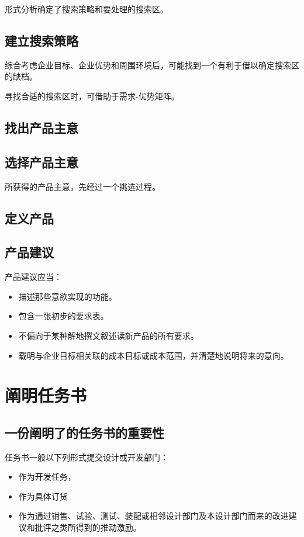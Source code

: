 \documentclass[letterpaper,10pt,english]{sphinxmanual}
\begin{document}
形式分析确定了搜索策略和要处理的搜索区。


\subsection{建立搜索策略}
\label{unit4:id5}
综合考虑企业目标、企业优势和周围环境后，可能找到一个有利于借以确定搜索区的缺档。

寻找合适的搜索区时，可借助于需求-优势矩阵。


\subsection{找出产品主意}
\label{unit4:id6}

\subsection{选择产品主意}
\label{unit4:id7}
所获得的产品主意，先经过一个挑选过程。


\subsection{定义产品}
\label{unit4:id8}

\subsection{产品建议}
\label{unit4:id9}
产品建议应当：
\begin{itemize}
\item {} 
描述那些意欲实现的功能。

\item {} 
包含一张初步的要求表。

\item {} 
不偏向于某种解地撰文叙述读新产品的所有要求。

\item {} 
载明与企业目标相关联的成本目标或成本范围，并清楚地说明将来的意向。

\end{itemize}


\section{阐明任务书}
\label{unit4:id10}

\subsection{一份阐明了的任务书的重要性}
\label{unit4:id11}
任务书一般以下列形式提交设计或开发部门：
\begin{itemize}
\item {} 
作为开发任务，

\item {} 
作为具体订货

\item {} 
作为通过销售、试验、测试、装配或相邻设计部门及本设计部门而来的改进建议和批评之类所得到的推动激励。

\end{itemize}
\end{document}
